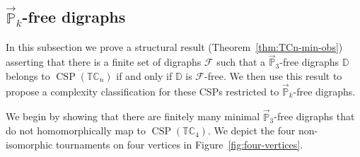 \documentclass{article}
\theoremstyle{definition}
\theoremstyle{remark}
\DeclareMathOperator{\CSP}{CSP}
\newcommand{\bC}{{\mathbb C}}
\newcommand{\bD}{{\mathbb D}}
\newcommand{\bP}{{\mathbb P}}
\newcommand{\bT}{{\mathbb T}}
\newcommand{\calF}{{\mathcal F}}
\begin{document}
\subsection{$\vec{\bP}_k$-free digraphs}


In this subsection we prove a structural result (Theorem~\ref{thm:TCn-min-obs})
asserting that there is a finite set of digraphs $\calF$ such that a $\vec{\bP}_3$-free
digraphs $\bD$ belongs to $\CSP(\bT\bC_n)$ if and only if $\bD$ is $\calF$-free. 
We then use this result to  propose a complexity classification for
these CSPs restricted to $\vec{\bP}_k$-free digraphs.

We begin by showing that there are finitely many minimal $\vec{\bP}_3$-free digraphs
that do not homomorphically map to $\CSP(\bT\bC_4)$. We depict the four non-isomorphic
tournaments on four vertices in Figure~\ref{fig:four-vertices}.
\end{document}
